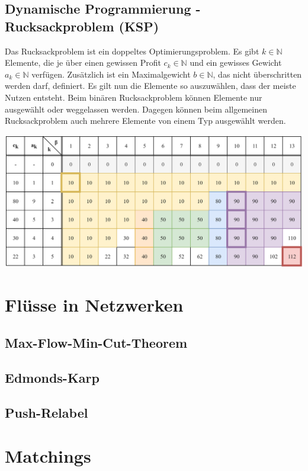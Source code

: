 \documentclass[10pt,a4paper,landscape]{article}
\begin{document}
\begin{multicols*}{2}
    \subsection{ Dynamische Programmierung - Rucksackproblem (KSP) }
    Das Rucksackproblem ist ein doppeltes Optimierungsproblem. Es gibt $k \in \mathbb{N}$ Elemente, 
    die je über einen gewissen Profit $c_k \in \mathbb{N}$ und ein gewisses Gewicht $a_k \in \mathbb{N}$ verfügen. 
    Zusätzlich ist ein Maximalgewicht $b \in \mathbb{N}$, das nicht überschritten werden darf, definiert. 
    Es gilt nun die Elemente so auszuwählen, dass der meiste Nutzen entsteht.
    \newline
    Beim binären Rucksackproblem können Elemente nur ausgewählt oder weggelassen werden. Dagegen können beim allgemeinen Rucksackproblem 
    auch mehrere Elemente von einem Typ ausgewählt werden.
    \newpage    
    \begin{center}
        \includegraphics[width=0.95\linewidth,keepaspectratio]{KSP.png}
    \end{center}
    

\section{ Flüsse in Netzwerken }
    \subsection{ Max-Flow-Min-Cut-Theorem }

    \subsection{ Edmonds-Karp }

    \subsection{ Push-Relabel }


\section{ Matchings }

\end{multicols*}
\end{document}

